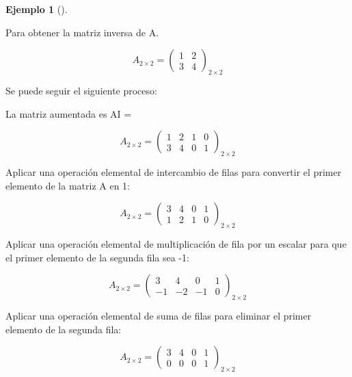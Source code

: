 \documentclass[
  letterpaper,
  DIV=11,
  numbers=noendperiod]{scrreprt}
\theoremstyle{definition}
\newtheorem{example}{Ejemplo}[chapter]
\theoremstyle{definition}
\theoremstyle{remark}
\begin{document}
\leavevmode{}%
\begin{example}[]\label{exm-ejemplo1}

Para obtener la matriz inversa de A.

\begin{equation*}
A_{2 \times 2}=
\begin{pmatrix}
1 & 2 \\
3 & 4 
\end{pmatrix} _{2 \times 2}
\end{equation*}

Se puede seguir el siguiente proceso:

La matriz aumentada es A\textbar I =

\begin{equation*}
A_{2 \times 2}=
\begin{pmatrix}
1 & 2 & 1 & 0 \\
3 & 4 & 0 & 1 
\end{pmatrix} _{2 \times 2}
\end{equation*}

Aplicar una operación elemental de intercambio de filas para convertir
el primer elemento de la matriz A en 1:

\begin{equation*}
A_{2 \times 2}=
\begin{pmatrix}
3 & 4 & 0 & 1 \\
1 & 2 & 1 & 0 
\end{pmatrix} _{2 \times 2}
\end{equation*}

Aplicar una operación elemental de multiplicación de fila por un escalar
para que el primer elemento de la segunda fila sea -1:

\begin{equation*}
A_{2 \times 2}=
\begin{pmatrix}
3 & 4 & 0 & 1 \\
-1 & -2 & -1 & 0 
\end{pmatrix} _{2 \times 2}
\end{equation*}

Aplicar una operación elemental de suma de filas para eliminar el primer
elemento de la segunda fila:

\begin{equation*}
A_{2 \times 2}=
\begin{pmatrix}
3 & 4 & 0 & 1 \\
0 & 0 & 0 & 1 
\end{pmatrix} _{2 \times 2}
\end{equation*}


\end{example}
\end{document}
